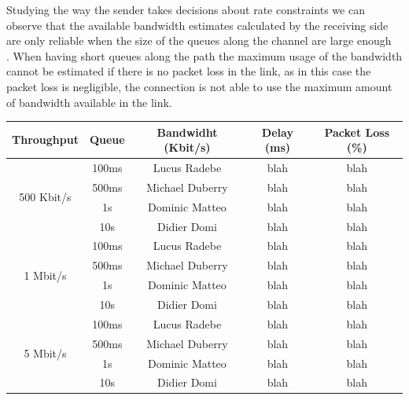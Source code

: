 Studying the way the sender takes decisions about rate constraints we can observe that the available bandwidth estimates calculated by the receiving side are only reliable when the size of the queues along the channel are large enough~\cite{alvestrandCongestion2012} . When having short queues along the path the maximum usage of the bandwidth cannot be estimated if there is no packet loss in the link, as in this case the packet loss is negligible, the connection is not able to use the maximum amount of bandwidth available in the link.


\begin{tabular}{ |c|c|c|c|c| }
\hline
Throughput & Queue & Bandwidht (Kbit/s) & Delay (ms) & Packet Loss (\%)\\ \hline
\multirow{4}{*}{500 Kbit/s} & 100ms & Lucus Radebe & blah & blah\\ \cline{2-5}
 & 500ms & Michael Duberry & blah & blah \\ \cline{2-5}
 & 1s & Dominic Matteo & blah & blah \\ \cline{2-5}
 & 10s & Didier Domi & blah & blah \\ \hline
\multirow{4}{*}{1 Mbit/s} & 100ms & Lucus Radebe & blah & blah\\ \cline{2-5}
 & 500ms & Michael Duberry & blah & blah \\ \cline{2-5}
 & 1s & Dominic Matteo & blah & blah \\ \cline{2-5}
 & 10s & Didier Domi & blah & blah \\ \hline
\multirow{4}{*}{5 Mbit/s} & 100ms & Lucus Radebe & blah & blah\\ \cline{2-5}
 & 500ms & Michael Duberry & blah & blah \\ \cline{2-5}
 & 1s & Dominic Matteo & blah & blah \\ \cline{2-5}
 & 10s & Didier Domi & blah & blah \\ \hline
\end{tabular}

